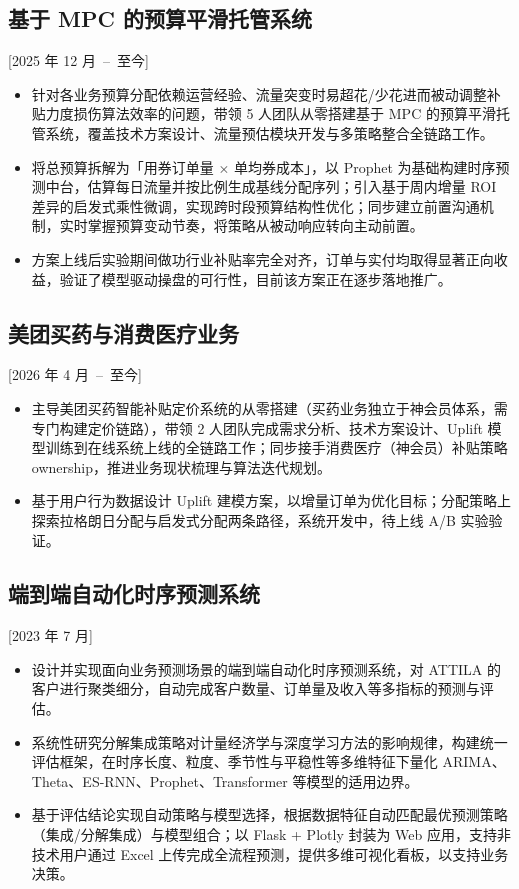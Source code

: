 \documentclass{mycv}
\begin{document}
\subsection{基于 MPC 的预算平滑托管系统}[2025 年 12 月~--~至今]

\begin{itemize}
  \itemsep 0.4em
  \item 针对各业务预算分配依赖运营经验、流量突变时易超花/少花进而被动调整补贴力度损伤算法效率的问题，带领 5 人团队从零搭建基于 MPC 的预算平滑托管系统，覆盖技术方案设计、流量预估模块开发与多策略整合全链路工作。
  \item 将总预算拆解为「用券订单量 $\times$ 单均券成本」，以 Prophet 为基础构建时序预测中台，估算每日流量并按比例生成基线分配序列；引入基于周内增量 ROI 差异的启发式乘性微调，实现跨时段预算结构性优化；同步建立前置沟通机制，实时掌握预算变动节奏，将策略从被动响应转向主动前置。
  \item 方案上线后实验期间做功行业补贴率完全对齐，订单与实付均取得显著正向收益，验证了模型驱动操盘的可行性，目前该方案正在逐步落地推广。
\end{itemize}


\subsection{美团买药与消费医疗业务}[2026 年 4 月~--~至今]

\begin{itemize}
  \itemsep 0.4em
  \item 主导美团买药智能补贴定价系统的从零搭建（买药业务独立于神会员体系，需专门构建定价链路），带领 2 人团队完成需求分析、技术方案设计、Uplift 模型训练到在线系统上线的全链路工作；同步接手消费医疗（神会员）补贴策略 ownership，推进业务现状梳理与算法迭代规划。
  \item 基于用户行为数据设计 Uplift 建模方案，以增量订单为优化目标；分配策略上探索拉格朗日分配与启发式分配两条路径，系统开发中，待上线 A/B 实验验证。
\end{itemize}


\subsection{端到端自动化时序预测系统}[2023 年 7 月]

\begin{itemize}
  \itemsep 0.4em
  \item 设计并实现面向业务预测场景的端到端自动化时序预测系统，对 ATTILA 的客户进行聚类细分，自动完成客户数量、订单量及收入等多指标的预测与评估。
  \item 系统性研究分解集成策略对计量经济学与深度学习方法的影响规律，构建统一评估框架，在时序长度、粒度、季节性与平稳性等多维特征下量化 ARIMA、Theta、ES-RNN、Prophet、Transformer 等模型的适用边界。
  \item 基于评估结论实现自动策略与模型选择，根据数据特征自动匹配最优预测策略（集成/分解集成）与模型组合；以 Flask + Plotly 封装为 Web 应用，支持非技术用户通过 Excel 上传完成全流程预测，提供多维可视化看板，以支持业务决策。
\end{itemize}
\end{document}
